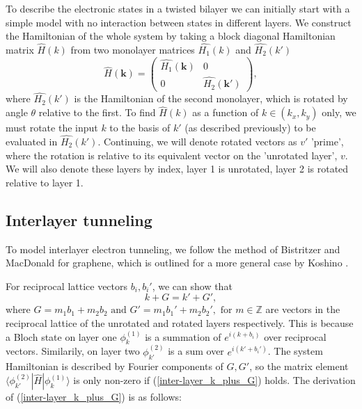 \documentclass[12pt]{report} %
\begin{document}
  To describe the electronic states in a twisted bilayer we can initially start with a simple model with no interaction between states in different layers. We construct the Hamiltonian of the whole system by taking a block diagonal Hamiltonian matrix $\hat{H}(k)$ from two monolayer matrices $\hat{H_1}(k)$ and $\hat{H_2}(k')$
%
      \begin{equation}
        \hat{H}(\boldsymbol{k})=\left(\begin{array}{cc}
          \hat{H_1}(\boldsymbol{k}) & 0\\
          0 & \hat{H_2}(\boldsymbol{k'})
        \end{array}\right),
        \label{simple_bilayer_hamiltonian}
      \end{equation}
  where $\hat{H_2}(k')$ is the Hamiltonian of the second monolayer, which is rotated by angle $\theta$ relative to the first. To find $\hat{H}(k)$ as a function of $k \in (k_x, k_y)$ only, we must rotate the input $k$ to the basis of $k'$ (as described previously) to be evaluated in $\hat{H_2}(k')$. Continuing, we will denote rotated vectors as $v'$ 'prime', where the rotation is relative to its equivalent vector on the 'unrotated layer', $v$. We will also denote these layers by index, layer 1 is unrotated, layer 2 is rotated relative to layer 1.

\subsection*{Interlayer tunneling}
  To model interlayer electron tunneling, we follow the method of Bistritzer and MacDonald \cite{Bistritzer2010, Bistritzer2011} for graphene, which is outlined for a more general case by Koshino \cite{Koshino2015}.

  For reciprocal lattice vectors $b_i, b_i'$, we can show that
  \begin{equation}
    k + G = k' + G',
    \label{inter-layer_k_plus_G}
  \end{equation}
  where $G = m_1 b_1 + m_2 b_2 \text{ and } G' = m_1 b_1' + m_2 b_2',\text{ for } m\in \mathbb{Z}$ are vectors in the reciprocal lattice of the unrotated and rotated layers respectively. This is because a Bloch state on layer one $\phi_k^{(1)}$ is a summation of $e^{i(k+b_i)}$ over reciprocal vectors. Similarily, on layer two $\phi_{k'}^{(2)}$ is a sum over $e^{i(k'+b_i')}$. The system Hamiltonian is described by Fourier components of $G, G'$, so the matrix element $\langle \phi_{k'}^{(2)} | \hat{H} | \phi_{k}^{(1)} \rangle$ is only non-zero if (\ref{inter-layer_k_plus_G}) holds. The derivation of (\ref{inter-layer_k_plus_G}) is as follows:
\end{document}
